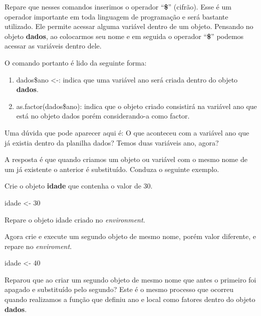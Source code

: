\documentclass[14pt,titlepage, oneside, openany, a4paper]{book}
\newenvironment{Shaded}{\begin{snugshade}}{\end{snugshade}}
\newcommand{\DecValTok}[1]{\textcolor[rgb]{0.00,0.00,0.81}{#1}}
\newcommand{\NormalTok}[1]{#1}
\newcommand{\StringTok}[1]{\textcolor[rgb]{0.31,0.60,0.02}{#1}}
\providecommand{\tightlist}{%
  \setlength{\itemsep}{0pt}\setlength{\parskip}{0pt}}
\begin{document}
Repare que nesses comandos inserimos o operador ``\textbf{\$}'' (cifrão). Esse é um operador importante em toda linguagem de programação e será bastante utilizado. Ele permite acessar alguma variável dentro de um objeto. Pensando no objeto \textbf{dados}, ao colocarmos seu nome e em seguida o operador ``\textbf{\$}'' podemos acessar as variáveis dentro dele.

O comando portanto é lido da seguinte forma:

\begin{enumerate}
\def\labelenumi{\arabic{enumi}.}
\tightlist
\item
  dados\$ano \textless{}-: indica que uma variável ano será criada dentro do objeto \textbf{dados}.
\item
  as.factor(dados\$ano): indica que o objeto criado consistirá na variável ano que está no objeto dados porém considerando-a como factor.
\end{enumerate}

Uma dúvida que pode aparecer aqui é: O que aconteceu com a variável ano que já existia dentro da planilha dados? Temos duas variáveis ano, agora?

A resposta é que quando criamos um objeto ou variável com o mesmo nome de um já existente o anterior é substituído. Conduza o seguinte exemplo.

Crie o objeto \textbf{idade} que contenha o valor de 30.

\begin{Shaded}
\begin{Highlighting}[]
\NormalTok{idade <-}\StringTok{ }\DecValTok{30}
\end{Highlighting}
\end{Shaded}

Repare o objeto idade criado no \emph{environment}.

Agora crie e execute um segundo objeto de mesmo nome, porém valor diferente, e repare no \emph{enviroment}.

\begin{Shaded}
\begin{Highlighting}[]
\NormalTok{idade <-}\StringTok{ }\DecValTok{40}
\end{Highlighting}
\end{Shaded}

Reparou que ao criar um segundo objeto de mesmo nome que antes o primeiro foi apagado e substituído pelo segundo? Este é o mesmo processo que ocorreu quando realizamos a função que definiu ano e local como fatores dentro do objeto \textbf{dados}.
\end{document}
